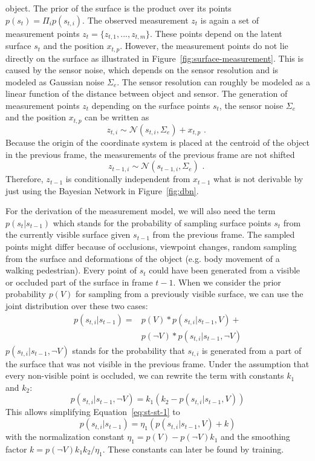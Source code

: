 \documentclass[twoside,a4paper,article]{combine}
\begin{document}
object. The prior of the surface is the product over its points
$p(s_{t})=\Pi_i p(s_{t,i})$.
The observed measurement $z_t$ is again a set of measurement points
$z_t=\{z_{t,1}, ..., z_{t,m}\}$. These points depend on the latent
surface $s_t$ and the position $x_{t,p}$. However, the measurement
points do not lie directly on the surface as illustrated in
Figure~\ref{fig:surface-measurement}. This is caused by the sensor
noise, which depends on the sensor resolution and is modeled as
Gaussian noise $\Sigma_e$. The sensor resolution can roughly be modeled as a
linear function of the distance between object and sensor. The
generation of measurement points $z_t$ depending on the surface points
$s_t$, the sensor noise $\Sigma_e$ and the position $x_{t,p}$ can be written as
\begin{equation}
\label{eq:gaus-zt}
z_{t,i} \sim \mathcal{N}(s_{t,i},\Sigma_e) + x_{t,p} \mbox{ . }
\end{equation}
Because the origin of the coordinate system is placed at the centroid
of the object in the previous frame, the measurements of the previous
frame are not shifted
\begin{equation}
\label{eq:ind-centroid}
z_{t-1,i} \sim \mathcal{N}(s_{t-1,i},\Sigma_e) \mbox{ . }
\end{equation}
Therefore, $z_{t-1}$ is conditionally independent from $x_{t-1}$ what
is not derivable by just using the Bayesian Network in
Figure~\ref{fig:dbn}.

For the derivation of the measurement model, we will also need the
term $p(s_t|s_{t-1})$ which stands for the probability of sampling
surface points $s_t$ from the currently visible surface given
$s_{t-1}$ from the previous frame. The sampled points might differ
because of occlusions, viewpoint changes, random sampling from the
surface and deformations of the object (e.g. body movement of a
walking pedestrian). Every point of $s_t$ could have been generated
from a visible or occluded part of the surface in frame $t-1$. When we
consider the prior probability $p(V)$ for sampling from a previously
visible surface, we can use the joint distribution over these two
cases:
\begin{align}
\label{eq:st-st-1}
p(s_{t,i}|s_{t-1})=&p(V)*p(s_{t,i}|s_{t-1},V) + \nonumber\\
&p(\neg V)*p(s_{t,i}|s_{t-1},\neg V)
\end{align}
$p(s_{t,i}|s_{t-1},\neg V)$ stands for the probability that $s_{t,i}$
is generated from a part of the surface that was not visible in the
previous frame. Under the assumption that every non-visible point is
occluded, we can rewrite the term with constants $k_1$ and $k_2$:
\begin{equation}
p(s_{t,i}|s_{t-1},\neg V) = k_1 (k_2 - p(s_{t,i}|s_{t-1},V))
\end{equation}
This allows simplifying Equation~\ref{eq:st-st-1} to
\begin{equation}
\label{eq:prob-surf}
p(s_{t,i}|s_{t-1})=\eta_1 (p(s_{t,i}|s_{t-1},V) + k)
\end{equation}
with the normalization constant $\eta_1=p(V)-p(\neg V) k_1$ and the
smoothing factor $k=p(\neg V)k_1k_2/\eta_1$.
These constants can later be found by training.
\end{document}
